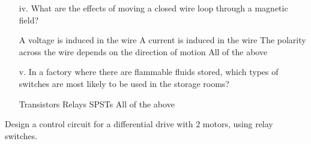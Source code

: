 \documentclass[12pt]{exam}
\begin{document}
\begin{questions}
\begin{enumerate}
\item[iv.]What are the effects of moving a closed wire loop through a magnetic field?

\begin{choices}
\choice  A voltage is induced in the wire
\choice A current is induced in the wire 
\choice The polarity across the wire depends on the direction of motion
\choice All of the above
\end{choices}

\item[v.]In a factory where there are flammable fluids stored, which types of switches are most likely to be used in the storage rooms?
\begin{multicols}{2}
\begin{choices}
\choice Transistors
\choice Relays 
\choice SPSTs 
\choice All of the above
\end{choices}
\end{multicols}

\end{enumerate}

\question[5] Design a control circuit for a differential drive with 2 motors, using relay switches.
\end{questions}
\newpage
\end{document}
